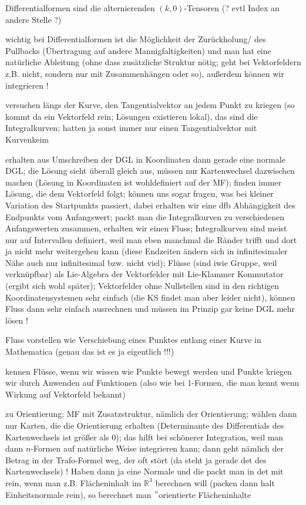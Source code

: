 Differentialformen sind die alternierenden $(k, 0)$-Tensoren (? evtl Index an andere Stelle ?)

wichtig bei Differentialformen ist die Möglichkeit der Zurückholung/ des Pullbacks (Übertragung auf andere Mannigfaltigkeiten) und man hat eine natürliche Ableitung (ohne dass zusätzliche Struktur nötig; geht bei Vektorfeldern z.B. nicht, sondern nur mit Zusammenhängen oder so), außerdem können wir integrieren !


versuchen längs der Kurve, den Tangentialvektor an jedem Punkt zu kriegen (so kommt da ein Vektorfeld rein; Lösungen existieren lokal), das sind die Integralkurven; hatten ja sonst immer nur einen Tangentialvektor mit Kurvenkeim

erhalten aus Umschreiben der DGL in Koordinaten dann gerade eine normale DGL; die Lösung sieht überall gleich aus, müssen nur Kartenwechsel dazwischen machen (Lösung in Koordinaten ist wohldefiniert auf der MF); finden immer Lösung, die dem Vektorfeld folgt; können uns sogar fragen, was bei kleiner Variation des Startpunkts passiert, dabei erhalten wir eine dfb Abhängigkeit des Endpunkts vom Anfangswert; packt man die Integralkurven zu verschiedenen Anfangswerten zusammen, erhalten wir einen Fluss; Integralkurven sind meist nur auf Intervallen definiert, weil man eben manchmal die Ränder trifft und dort ja nicht mehr weitergehen kann (diese Endzeiten ändern sich in infinitesimaler Nähe auch nur infinitesimal bzw. nicht viel); Flüsse (sind iwie Gruppe, weil verknüpfbar) als Lie-Algebra der Vektorfelder mit Lie-Klammer Kommutator (ergibt sich wohl später); Vektorfelder ohne Nullstellen sind in den richtigen Koordinatensystemen sehr einfach (die KS findet man aber leider nicht), können Fluss dann sehr einfach ausrechnen und müssen im Prinzip gar keine DGL mehr lösen !


Fluss vorstellen wie Verschiebung eines Punktes entlang einer Kurve in Mathematica (genau das ist es ja eigentlich !!!)

kennen Flüsse, wenn wir wissen wie Punkte bewegt werden und Punkte kriegen wir durch Anwenden auf Funktionen (also wie bei 1-Formen, die man kennt wenn Wirkung auf Vektorfeld bekannt)


zu Orientierung: MF mit Zusatzstruktur, nämlich der Orientierung; wählen dann nur Karten, die die Orientierung erhalten (Determinante des Differentials des Kartenwechsels ist größer als 0); das hilft bei schönerer Integration, weil man dann $n$-Formen auf natürliche Weise integrieren kann; dann geht nämlich der Betrag in der Trafo-Formel weg, der oft stört (da steht ja gerade det des Kartenwechsels) ! Haben dann ja eine Normale und die packt man in det mit rein, wenn man z.B. Flächeninhalt im $\mathbb{R}^3$ berechnen will (packen dann halt Einheitsnormale rein), so berechnet man $"$orientierte Flächeninhalte

